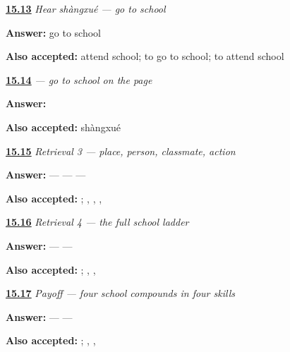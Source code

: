 \noindent\begin{minipage}[t]{\linewidth}
\raggedright
\hyperlink{review-ZH-C15-hear-shangxue-meaning}{\textbf{15.13}} \emph{Hear \emph{shàngxué} — go to school}\par
\small \textbf{Answer:} go to school\par
\footnotesize \textbf{Also accepted:} attend school; to go to school; to attend school
\end{minipage}\par\medskip

\noindent\begin{minipage}[t]{\linewidth}
\raggedright
\hyperlink{review-ZH-C15-shangxue-write}{\textbf{15.14}} \emph{ — go to school on the page}\par
\small \textbf{Answer:} \par
\footnotesize \textbf{Also accepted:}  shàngxué
\end{minipage}\par\medskip

\noindent\begin{minipage}[t]{\linewidth}
\raggedright
\hyperlink{review-ZH-R15-school-map-3-recall}{\textbf{15.15}} \emph{Retrieval 3 — place, person, classmate, action}\par
\small \textbf{Answer:}  —  —  — \par
\footnotesize \textbf{Also accepted:}    ; , , , 
\end{minipage}\par\medskip

\noindent\begin{minipage}[t]{\linewidth}
\raggedright
\hyperlink{review-ZH-R15-school-map-4-recall}{\textbf{15.16}} \emph{Retrieval 4 — the full school ladder}\par
\small \textbf{Answer:}  —  — \par
\footnotesize \textbf{Also accepted:}   ; , , 
\end{minipage}\par\medskip

\noindent\begin{minipage}[t]{\linewidth}
\raggedright
\hyperlink{review-ZH-C15-practice-school-payoff}{\textbf{15.17}} \emph{Payoff — four school compounds in four skills}\par
\small \textbf{Answer:}  —  — \par
\footnotesize \textbf{Also accepted:}   ; , , 
\end{minipage}\par\medskip

